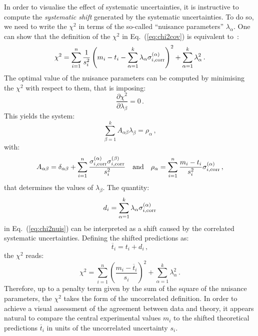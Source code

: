 \documentclass[10pt,a4paper]{article}
\begin{document}
In order to visualise the effect of systematic uncertainties, it is
instructive to compute the \textit{systematic shift} generated by the
systematic uncertainties. To do so, we need to write the $\chi^2$ in
terms of the so-called ``nuisance parameters'' $\lambda_\alpha$. One
can show that the definition of the $\chi^2$ in Eq.~(\ref{eq:chi2cov})
is equivalent to~\cite{Ball:2012wy}:
\begin{equation}\label{eq:chi2nuis}
\chi^2 = \sum_{i=1}^n\frac{1}{s_i^2}\left(m_i -t_i
  -\sum_{\alpha=1}^k\lambda_\alpha \sigma_{i,\rm corr}^{(\alpha)} \right)^2 + \sum_{\alpha=1}^k\lambda_\alpha^2\,.
\end{equation}
The optimal value of the nuisance parameters can be computed by
minimising the $\chi^2$ with respect to them, that is imposing:
\begin{equation}
\frac{\partial \chi^2}{\partial \lambda_\beta} = 0\,.
\end{equation}
This yields the system:
\begin{equation}\label{eq:nuissys}
  \sum_{\beta=1}^kA_{\alpha\beta}\lambda_\beta =\rho_\alpha\,,
\end{equation}
with:
\begin{equation}\label{eq:sysing}
A_{\alpha\beta}= \delta_{\alpha\beta}+\sum_{i=1}^n\frac{\sigma_{i,\rm corr}^{(\alpha)}\sigma_{i,\rm corr}^{(\beta)}}{s_i^2}\quad\mbox{and}\quad \rho_\alpha=\sum_{i=1}^n\frac{m_i-t_i}{s_i^2}\sigma_{i,\rm corr}^{(\alpha)}\,,
\end{equation}
that determines the values of $\lambda_\beta$. The quantity:
\begin{equation}
d_i =\sum_{\alpha=1}^k\lambda_\alpha \sigma_{i,\rm corr}^{(\alpha)}
\end{equation}
in Eq.~(\ref{eq:chi2nuis}) can be interpreted as a shift caused by the
correlated systematic uncertainties. Defining the shifted predictions
as:
\begin{equation}
\overline{t}_i =t_i+d_i\,,
\end{equation}
the $\chi^2$ reads:
\begin{equation}\label{eq:chi2nuisshift}
  \chi^2 = \sum_{i=1}^n\left(\frac{m_i -\overline{t}_i}{s_i}\right)^2 + \sum_{\alpha=1}^k\lambda_\alpha^2\,.
\end{equation}
Therefore, up to a penalty term given by the sum of the square of the
nuisance parameters, the $\chi^2$ takes the form of the uncorrelated
definition. In order to achieve a visual assessment of the agreement
between data and theory, it appears natural to compare the central
experimental values $m_i$ to the shifted theoretical predictions
$\overline{t}_i$ in units of the uncorrelated uncertainty $s_i$.
\end{document}

